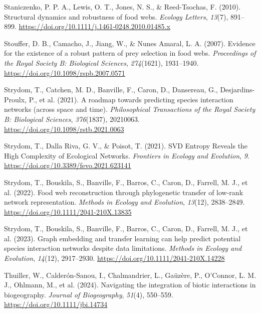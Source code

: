\documentclass[
]{agujournal2019}
\newlength{\cslhangindent}
\newenvironment{CSLReferences}[2] %
 {\begin{list}{}{%
  \setlength{\itemindent}{0pt}
  \setlength{\leftmargin}{0pt}
  \setlength{\parsep}{0pt}
  \ifodd #1
   \setlength{\leftmargin}{\cslhangindent}
   \setlength{\itemindent}{-1\cslhangindent}
  \fi
  \setlength{\itemsep}{#2\baselineskip}}}
 {\end{list}}
\begin{document}
\begin{CSLReferences}{1}{0}
Staniczenko, P. P. A., Lewis, O. T., Jones, N. S., \& Reed-Tsochas, F.
(2010). Structural dynamics and robustness of food webs. \emph{Ecology
Letters}, \emph{13}(7), 891--899.
\url{https://doi.org/10.1111/j.1461-0248.2010.01485.x}

Stouffer, D. B., Camacho, J., Jiang, W., \& Nunes Amaral, L. A. (2007).
Evidence for the existence of a robust pattern of prey selection in food
webs. \emph{Proceedings of the Royal Society B: Biological Sciences},
\emph{274}(1621), 1931--1940.
\url{https://doi.org/10.1098/rspb.2007.0571}

Strydom, T., Catchen, M. D., Banville, F., Caron, D., Dansereau, G.,
Desjardins-Proulx, P., et al. (2021). A roadmap towards predicting
species interaction networks (across space and time).
\emph{Philosophical Transactions of the Royal Society B: Biological
Sciences}, \emph{376}(1837), 20210063.
\url{https://doi.org/10.1098/rstb.2021.0063}

Strydom, T., Dalla Riva, G. V., \& Poisot, T. (2021). {SVD Entropy
Reveals} the {High Complexity} of {Ecological Networks}. \emph{Frontiers
in Ecology and Evolution}, \emph{9}.
\url{https://doi.org/10.3389/fevo.2021.623141}

Strydom, T., Bouskila, S., Banville, F., Barros, C., Caron, D., Farrell,
M. J., et al. (2022). Food web reconstruction through phylogenetic
transfer of low-rank network representation. \emph{Methods in Ecology
and Evolution}, \emph{13}(12), 2838--2849.
\url{https://doi.org/10.1111/2041-210X.13835}

Strydom, T., Bouskila, S., Banville, F., Barros, C., Caron, D., Farrell,
M. J., et al. (2023). Graph embedding and transfer learning can help
predict potential species interaction networks despite data limitations.
\emph{Methods in Ecology and Evolution}, \emph{14}(12), 2917--2930.
\url{https://doi.org/10.1111/2041-210X.14228}

Thuiller, W., Calderón-Sanou, I., Chalmandrier, L., Gaüzère, P.,
O'Connor, L. M. J., Ohlmann, M., et al. (2024). Navigating the
integration of biotic interactions in biogeography. \emph{Journal of
Biogeography}, \emph{51}(4), 550--559.
\url{https://doi.org/10.1111/jbi.14734}


\end{CSLReferences}
\end{document}
